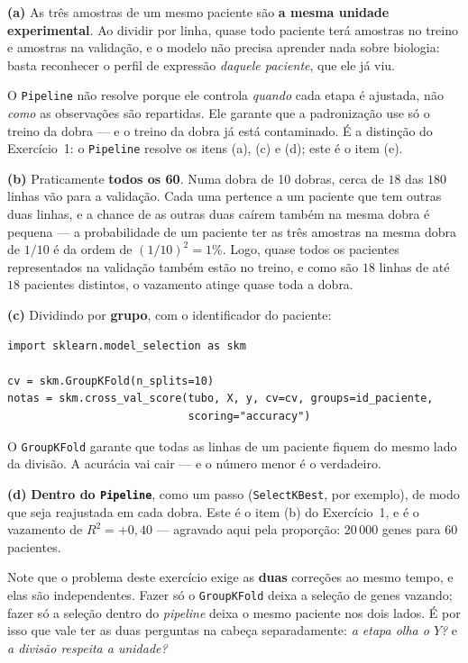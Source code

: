\documentclass[11pt,a4paper]{article}
\begin{document}
\begin{solucao}
\textbf{(a)} As três amostras de um mesmo paciente são \textbf{a mesma unidade
experimental}. Ao dividir por linha, quase todo paciente terá amostras no treino e
amostras na validação, e o modelo não precisa aprender nada sobre biologia: basta
reconhecer o perfil de expressão \emph{daquele paciente}, que ele já viu.

O \texttt{Pipeline} não resolve porque ele controla \emph{quando} cada etapa é
ajustada, não \emph{como} as observações são repartidas. Ele garante que a
padronização use só o treino da dobra --- e o treino da dobra já está
contaminado. É a distinção do Exercício~1: o \texttt{Pipeline} resolve os itens
(a), (c) e (d); este é o item (e).

\smallskip
\textbf{(b)} Praticamente \textbf{todos os 60}. Numa dobra de 10 dobras, cerca de
$18$ das $180$ linhas vão para a validação. Cada uma pertence a um paciente que
tem outras duas linhas, e a chance de as outras duas caírem também na mesma
dobra é pequena --- a probabilidade de um paciente ter as três amostras na mesma
dobra de $1/10$ é da ordem de $(1/10)^2 = 1\%$. Logo, quase todos os pacientes
representados na validação também estão no treino, e como são $18$ linhas de até
$18$ pacientes distintos, o vazamento atinge quase toda a dobra.

\smallskip
\textbf{(c)} Dividindo por \textbf{grupo}, com o identificador do paciente:
\begin{lstlisting}
import sklearn.model_selection as skm

cv = skm.GroupKFold(n_splits=10)
notas = skm.cross_val_score(tubo, X, y, cv=cv, groups=id_paciente,
                            scoring="accuracy")
\end{lstlisting}
O \texttt{GroupKFold} garante que todas as linhas de um paciente fiquem do mesmo
lado da divisão. A acurácia vai cair --- e o número menor é o verdadeiro.

\smallskip
\textbf{(d)} \textbf{Dentro do \texttt{Pipeline}}, como um passo
(\texttt{SelectKBest}, por exemplo), de modo que seja reajustada em cada dobra.
Este é o item (b) do Exercício~1, e é o vazamento de $R^2=+0{,}40$ --- agravado
aqui pela proporção: $20\,000$ genes para $60$ pacientes.

Note que o problema deste exercício exige as \textbf{duas} correções ao mesmo
tempo, e elas são independentes. Fazer só o \texttt{GroupKFold} deixa a seleção
de genes vazando; fazer só a seleção dentro do \emph{pipeline} deixa o mesmo
paciente nos dois lados. É por isso que vale ter as duas perguntas na cabeça
separadamente: \emph{a etapa olha o $Y$?} e \emph{a divisão respeita a unidade?}
\end{solucao}
\end{document}
